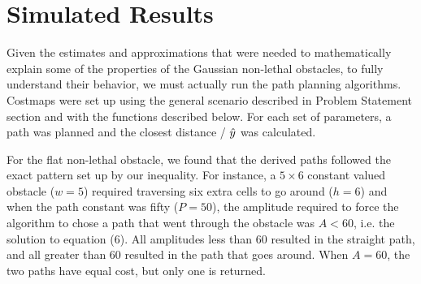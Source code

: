 \section{Simulated Results}



Given the estimates and approximations that were needed to mathematically explain some of the properties of the Gaussian non-lethal obstacles, to fully understand their behavior, we must actually run the path planning algorithms. Costmaps were set up using the general scenario described in Problem Statement section and with the functions described below. For each set of parameters, a path was planned and the closest distance / $\hat{y}$ was calculated. 

For the flat non-lethal obstacle, we found that the derived paths followed the exact pattern set up by our inequality. For instance, a $5\times6$ constant valued obstacle ($w=5$) required traversing six extra cells to go around ($h=6$) and when the path constant was fifty ($P=50$), the amplitude required to force the algorithm to chose a path that went through the obstacle was $A<60$, i.e. the solution to equation (6). All amplitudes less than 60 resulted in the straight path, and all greater than 60 resulted in the path that goes around. When $A=60$, the two paths have equal cost, but only one is returned.

